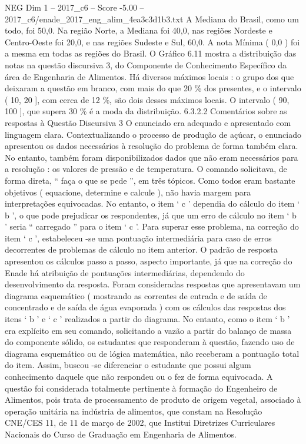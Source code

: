 \begin{textsample}{NEG Dim 1 – 2017\_c6 – Score -5.00 – 2017\_c6/enade\_2017\_eng\_alim\_4ea3c3d1b3.txt}
A Mediana do Brasil, como um todo, foi 50,0.
Na região Norte, a Mediana foi 40,0, nas regiões Nordeste e Centro-Oeste foi 20,0, e nas regiões Sudeste e Sul, 60,0.
A nota Mínima ( 0,0 ) foi a mesma em todas as regiões do Brasil.
O Gráfico 6.11 mostra a distribuição das notas na questão discursiva 3, do Componente de Conhecimento Específico da área de Engenharia de Alimentos.
Há diversos máximos locais : o grupo dos que deixaram a questão em branco, com mais do que 20 \% dos presentes, e o intervalo ( 10, 20 ], com cerca de 12 \%, são dois desses máximos locais.
O intervalo ( 90, 100 ], que supera 30 \% é a moda da distribuição. 6.3.2.2 Comentários sobre as respostas à Questão Discursiva 3 O enunciado era adequado e apresentado com linguagem clara.
Contextualizando o processo de produção de açúcar, o enunciado apresentou os dados necessários à resolução do problema de forma também clara.
No entanto, também foram disponibilizados dados que não eram necessários para a resolução : os valores de pressão e de temperatura.
O comando solicitava, de forma direta, “ faça o que se pede ”, em três tópicos.
Como todos eram bastante objetivos ( equacione, determine e calcule ), não havia margem para interpretações equivocadas.
No entanto, o item ‘ c ’ dependia do cálculo do item ‘ b ’, o que pode prejudicar os respondentes, já que um erro de cálculo no item ‘ b ’ seria “ carregado ” para o item ‘ c ’.
Para superar esse problema, na correção do item ‘ c ’, estabeleceu -se uma pontuação intermediária para caso de erros decorrentes de problemas de cálculo no item anterior.
O padrão de resposta apresentou os cálculos passo a passo, aspecto importante, já que na correção do Enade há atribuição de pontuações intermediárias, dependendo do desenvolvimento da resposta.
Foram consideradas respostas que apresentavam um diagrama esquemático ( mostrando as correntes de entrada e de saída de concentrado e de saída de água evaporada ) com os cálculos das respostas dos itens ‘ b ’ e ‘ c ’ realizados a partir do diagrama.
No entanto, como o item ‘ b ’ era explícito em seu comando, solicitando a vazão a partir do balanço de massa do componente sólido, os estudantes que responderam à questão, fazendo uso de diagrama esquemático ou de lógica matemática, não receberam a pontuação total do item.
Assim, buscou -se diferenciar o estudante que possui algum conhecimento daquele que não respondeu ou o fez de forma equivocada.
A questão foi considerada totalmente pertinente à formação do Engenheiro de Alimentos, pois trata de processamento de produto de origem vegetal, associado à operação unitária na indústria de alimentos, que constam na Resolução CNE/CES 11, de 11 de março de 2002, que Institui Diretrizes Curriculares Nacionais do Curso de Graduação em Engenharia de Alimentos.

\end{textsample}
